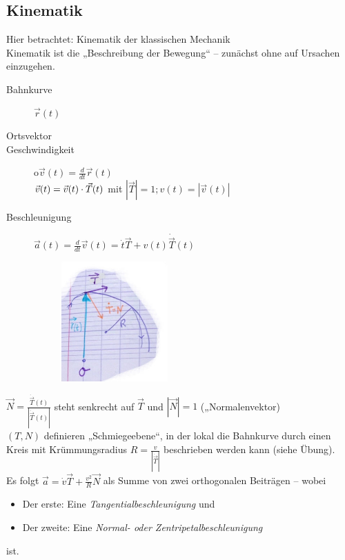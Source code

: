 \subsection{Kinematik}
Hier betrachtet: Kinematik der klassischen Mechanik\\
Kinematik ist die „Beschreibung der Bewegung“ -- zunächst ohne auf Ursachen einzugehen.
\begin{description}
\item[Bahnkurve] $\vec{r}(t)$
\item[Ortsvektor] %
\item[Geschwindigkeit] o$\vec{v}(t)=\frac{d}{dt}\vec{r}(t)$\\
$\vec{v}(t)=\vec{v}(t)\cdot \vec{T}(t)$ mit $|\vec{T}|=1; v(t)=|\vec{v}(t)|$
\item[Beschleunigung] $\vec{a}(t)=\frac{d}{dt}\vec{v}(t)=\dot{t}\vec{T}+v(t)\dot{\vec{T}}(t)$

\begin{figure}[h]
\begin{center}
\includegraphics[width=0.4\textwidth]{Skizzen/Anhang9.jpg}
\end{center}
\caption{}
\end{figure}
\end{description}
$\vec{N}=\frac{\dot{\vec{T}}(t)}{|\dot{\vec{T}}(t)|}$ steht senkrecht auf $\vec{T}$ und $|\vec{N}|=1$ („Normalenvektor)\\
$(T,N)$ definieren „Schmiegeebene“, in der lokal die Bahnkurve durch einen Kreis mit Krümmungsradius $R=\frac{v}{|\dot{\vec{T}}|}$ beschrieben werden kann (siehe Übung).\\
Es folgt $\vec{a}=\dot{v}\vec{T}+\frac{v^2}{R}\vec{N}$ als Summe von zwei orthogonalen Beiträgen -- wobei
\begin{itemize}
\item Der erste: Eine \emph{Tangentialbeschleunigung} und
\item Der zweite: Eine \emph{Normal- oder Zentripetalbeschleunigung}
\end{itemize}
ist.

